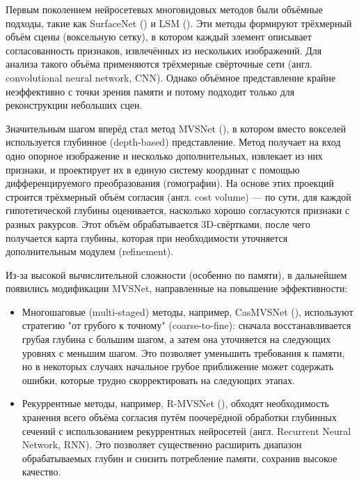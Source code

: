 Первым поколением нейросетевых многовидовых методов были объёмные подходы, такие
как SurfaceNet (\cite{ji2017surfacenet}) и LSM
(\cite{kar2017learningmultiviewstereomachine}). Эти методы формируют трёхмерный
объём сцены (воксельную сетку), в котором каждый элемент описывает
согласованность признаков, извлечённых из нескольких изображений. Для анализа
такого объёма применяются трёхмерные свёрточные сети (англ. convolutional neural
network, CNN). Однако объёмное представление крайне неэффективно с точки зрения
памяти и потому подходит только для реконструкции небольших сцен.

Значительным шагом вперёд стал метод MVSNet
(\cite{yao2018mvsnetdepthinferenceunstructured}), в котором вместо вокселей
используется глубинное (depth-based) представление. Метод получает на вход одно
опорное изображение и несколько дополнительных, извлекает из них признаки, и
проектирует их в единую систему координат с помощью дифференцируемого
преобразования (гомографии). На основе этих проекций строится трёхмерный
объём согласия (англ. cost volume) — по сути, для каждой гипотетической глубины
оценивается, насколько хорошо согласуются признаки с разных ракурсов. Этот объём
обрабатывается 3D-свёртками, после чего получается карта глубины, которая при
необходимости уточняется дополнительным модулем (refinement).

Из-за высокой вычислительной сложности (особенно по памяти), в дальнейшем
появились модификации MVSNet, направленные на повышение эффективности:

\begin{itemize}
	\item Многошаговые (multi-staged) методы, например, CasMVSNet
	(\cite{gu2020cascadecostvolumehighresolution}), используют стратегию "от
	грубого к точному" (coarse-to-fine): сначала восстанавливается грубая глубина
	с большим шагом, а затем она уточняется на следующих уровнях с меньшим шагом.
	Это позволяет уменьшить требования к памяти, но в некоторых случаях начальное
	грубое приближение может содержать ошибки, которые трудно скорректировать на
	следующих этапах.
	\item Рекуррентные методы, например, R-MVSNet
	(\cite{yao2019recurrentmvsnethighresolutionmultiview}), обходят необходимость
	хранения всего объёма согласия путём поочерёдной обработки глубинных сечений с
	использованием рекуррентных нейросетей (англ. Recurrent Neural Network, RNN).
	Это позволяет существенно расширить диапазон обрабатываемых глубин и снизить
	потребление памяти, сохранив высокое качество.
\end{itemize}

